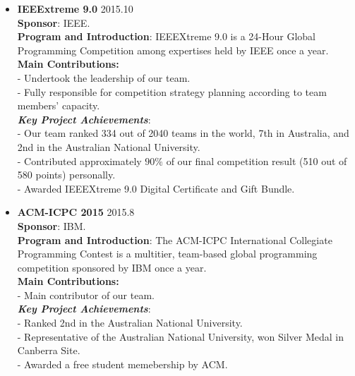 \documentclass{res}
\begin{document}
\begin{resume}
\begin{CJK*}{UTF8}{song}
\begin{itemize}
\itemsep -2pt %
  \item{\bf IEEExtreme 9.0} \hfill 2015.10 \vspace{3pt} \\
		\textbf{Sponsor}: IEEE. \vspace{3pt} \\
		\textbf{Program and Introduction}: IEEEXtreme 9.0 is a 24-Hour Global Programming Competition among expertises held by IEEE once a year. \vspace{3pt} \\
		\textbf{Main Contributions:} \vspace{3pt} \\
		- Undertook the leadership of our team. \\
		- Fully responsible for competition strategy planning according to team members' capacity. \vspace{3pt} \\		
		\textit{\textbf{Key Project Achievements}}: \vspace{3pt} \\
		- Our team ranked 334 out of 2040 teams in the world, 7th in Australia, and 2nd in the Australian National University. \\
		- Contributed approximately $90\%$ of our final competition result (510 out of 580 points) personally. \\
		- Awarded IEEEXtreme 9.0 Digital Certificate and Gift Bundle. \\
        
  \item{\bf ACM-ICPC 2015} \hfill 2015.8 \vspace{3pt} \\
  		\textbf{Sponsor}: IBM. \vspace{3pt} \\
		\textbf{Program and Introduction}: The ACM-ICPC International Collegiate Programming Contest is a multitier, team-based global programming competition sponsored by IBM once a year. \vspace{3pt} \\
		\textbf{Main Contributions:} \vspace{3pt} \\
		- Main contributor of our team. \vspace{3pt} \\
		\textit{\textbf{Key Project Achievements}}: \vspace{3pt} \\
		- Ranked 2nd in the Australian National University. \\
		- Representative of the Australian National University, won Silver Medal in Canberra Site. \\
		- Awarded a free student memebership by ACM.
			

\end{itemize}
\end{CJK*}
\end{resume}
\end{document}
